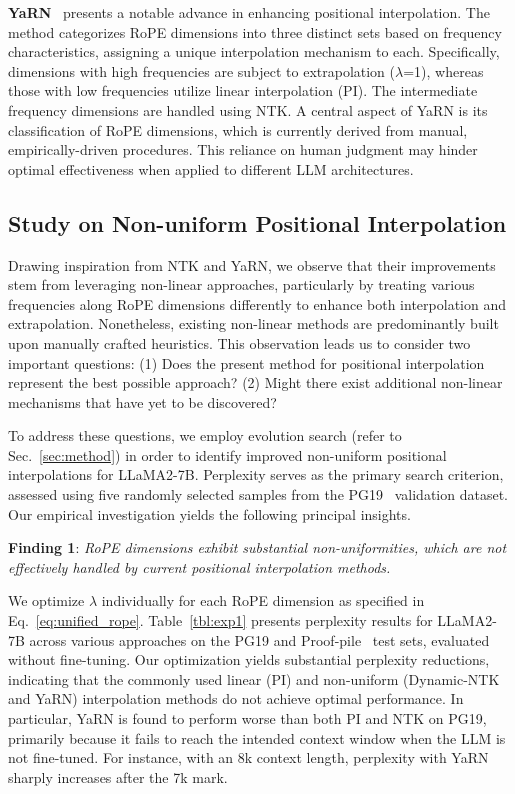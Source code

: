\textbf{YaRN}~\cite{yarn} presents a notable advance in enhancing positional interpolation. The method categorizes RoPE dimensions into three distinct sets based on frequency characteristics, assigning a unique interpolation mechanism to each. Specifically, dimensions with high frequencies are subject to extrapolation ($\lambda$=1), whereas those with low frequencies utilize linear interpolation (PI). The intermediate frequency dimensions are handled using NTK. A central aspect of YaRN is its classification of RoPE dimensions, which is currently derived from manual, empirically-driven procedures. This reliance on human judgment may hinder optimal effectiveness when applied to different LLM architectures.

\subsection{Study on Non-uniform Positional Interpolation}

Drawing inspiration from NTK and YaRN, we observe that their improvements stem from leveraging non-linear approaches, particularly by treating various frequencies along RoPE dimensions differently to enhance both interpolation and extrapolation. Nonetheless, existing non-linear methods are predominantly built upon manually crafted heuristics. This observation leads us to consider two important questions: (1) Does the present method for positional interpolation represent the best possible approach? (2) Might there exist additional non-linear mechanisms that have yet to be discovered?

To address these questions, we employ evolution search (refer to Sec.~\ref{sec:method}) in order to identify improved non-uniform positional interpolations for LLaMA2-7B. Perplexity serves as the primary search criterion, assessed using five randomly selected samples from the PG19~\cite{pg19} validation dataset. Our empirical investigation yields the following principal insights.

\textbf{Finding 1}: \textit{RoPE dimensions exhibit substantial non-uniformities, which are not effectively handled by current positional interpolation methods.}

We optimize $\lambda$ individually for each RoPE dimension as specified in Eq.~\ref{eq:unified_rope}. Table~\ref{tbl:exp1} presents perplexity results for LLaMA2-7B across various approaches on the PG19 and Proof-pile~\cite{proof-pile} test sets, evaluated without fine-tuning. Our optimization yields substantial perplexity reductions, indicating that the commonly used linear (PI) and non-uniform (Dynamic-NTK and YaRN) interpolation methods do not achieve optimal performance. In particular, YaRN is found to perform worse than both PI and NTK on PG19, primarily because it fails to reach the intended context window when the LLM is not fine-tuned. For instance, with an 8k context length, perplexity with YaRN sharply increases after the 7k mark.

